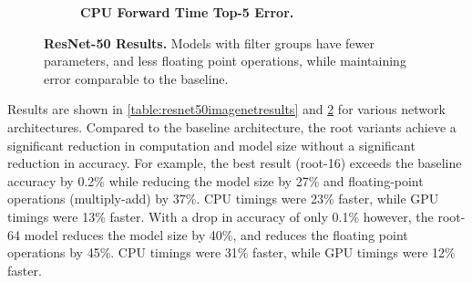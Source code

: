 \documentclass[thesis]{subfiles}
\begin{document}
\begin{figure}[tp]
\begin{subfigure}[b]{\linewidth}
			\centering
			\caption{\textbf{CPU Forward Time \vs Top-5 Error.}}
			\label{fig:resnet5050cpuforward}
		\end{subfigure}
		
		\caption{\textbf{ResNet-50 Results.} Models with filter groups have fewer parameters, and less floating point operations, while maintaining error comparable to the baseline.}
		\label{fig:resnet50plots}
	\end{figure}
	Results are shown in \cref{table:resnet50imagenetresults} and \cref{fig:resnet50plots} for various network architectures. Compared to the baseline architecture, the root variants achieve a significant reduction in computation and model size without a significant reduction in accuracy. For example, the best result (root-16) exceeds the baseline accuracy by 0.2\% while reducing the model size by 27\% and floating-point operations (multiply-add) by 37\%. CPU timings were 23\% faster, while GPU timings were 13\% faster. With a drop in accuracy of only 0.1\% however, the root-64 model reduces the model size by 40\%, and reduces the floating point operations by 45\%. CPU timings were 31\% faster, while GPU timings were 12\% faster. 
	
\end{document}
